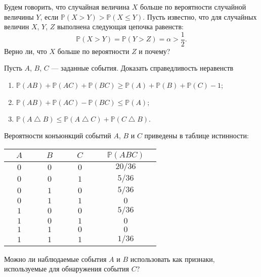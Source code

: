 \begin{problem}
Будем говорить, что случайная величина $X$ больше по вероятности случайной величины $Y$, если ${\mathbb P}(X>Y)>{\mathbb P}(X\le Y)$. 
Пусть известно, что для случайных величин $X$, $Y$, $Z$ выполнена следующая цепочка равенств: 
$$
{\mathbb P}(X>Y)={\mathbb P}(Y>Z)=\alpha>\frac{1}{2} . 
$$
Верно ли, что $X$ больше по вероятности $Z$ и почему? 
\end{problem}


\begin{problem}
Пусть $A$, $B$, $C$ --- заданные события. Доказать справедливость неравенств 
\begin{enumerate}
\item ${\mathbb P}(AB)+{\mathbb P}(AC)+{\mathbb P}(BC)\geqslant {\mathbb P}(A)+{\mathbb P}(B)+{\mathbb P}(C)-1$; 
\item ${\mathbb P}(AB)+{\mathbb P}(AC)-{\mathbb P}(BC)\leqslant {\mathbb P}(A)$; 
\item ${\mathbb P}(A\bigtriangleup B)\leqslant {\mathbb P}(A\bigtriangleup C)+{\mathbb P}(C\bigtriangleup B).$ 
\end{enumerate}
\end{problem}

\begin{problem}
Вероятности конъюнкций событий $A$, $B$ и $C$ приведены в таблице истинности: 
\vspace{0.3cm}

\begin{tabular}{|c|c|c|c|}
\hline
$\quad A\quad$ & $\quad B\quad$ & $\quad C\quad$ & $\quad {\mathbb P}(ABC)\quad$ \\
\hline
$0$ & $0$ & $0$ & $20/36$ \\
\hline
$0$ & $0$ & $1$ & $5/36$ \\
\hline
$0$ & $1$ & $0$ & $5/36$ \\
\hline
$0$ & $1$ & $1$ & $0$ \\
\hline
$1$ & $0$ & $0$ & $5/36$ \\
\hline
$1$ & $0$ & $1$ & $0$ \\
\hline
$1$ & $1$ & $0$ & $0$ \\
\hline
$1$ & $1$ & $1$ & $1/36$ \\
\hline
\end{tabular}

\vspace{0.3cm}

Можно ли наблюдаемые события $A$ и $B$ использовать как признаки, используемые для обнаружения события $C$? 
\end{problem}


